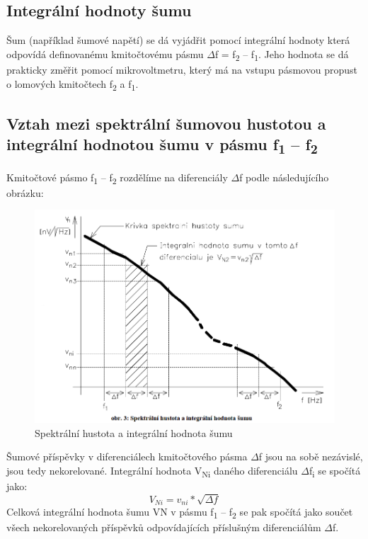 \subsection{Integrální hodnoty šumu}
Šum (například šumové napětí) se dá vyjádřit pomocí integrální hodnoty která odpovídá
definovanému kmitočtovému pásmu $\Delta$f = f\textsubscript{2} – f\textsubscript{1}. Jeho hodnota se dá prakticky změřit pomocí mikrovoltmetru, který má na vstupu pásmovou propust o lomových kmitočtech f\textsubscript{2} a f\textsubscript{1}.

\subsection{Vztah mezi spektrální šumovou hustotou a integrální hodnotou šumu
v pásmu f\textsubscript{1} – f\textsubscript{2}}
Kmitočtové pásmo f\textsubscript{1} – f\textsubscript{2} rozdělíme na diferenciály $\Delta$f podle následujícího obrázku:
\begin{figure}[h]
   \begin{center}
     \includegraphics[scale=0.5]{images/hustota.png}
   \end{center}
   \caption{Spektrální hustota a integrální hodnota šumu}
\end{figure}

Šumové příspěvky v diferenciálech kmitočtového pásma $\Delta$f jsou na sobě nezávislé, jsou tedy nekorelované. Integrální hodnota V\textsubscript{Ni} daného diferenciálu $\Delta$f\textsubscript{i} se spočítá jako:
\begin{equation}
V_{Ni}=v_{ni}*\sqrt{\Delta f}
\end{equation}
Celková integrální hodnota šumu VN v pásmu f\textsubscript{1} – f\textsubscript{2} se pak spočítá jako součet všech nekorelovaných příspěvků odpovídajících příslušným diferenciálům $\Delta$f.


